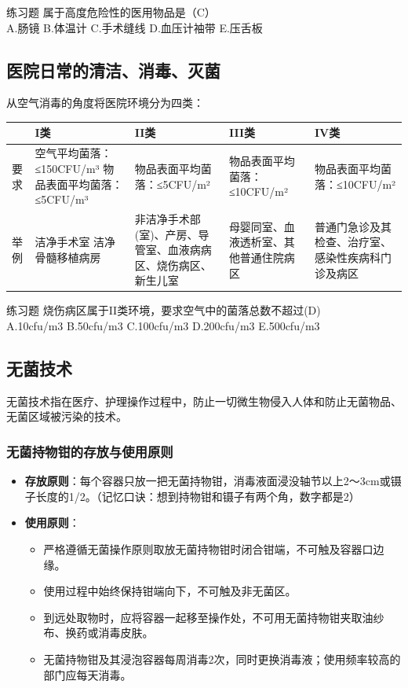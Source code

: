 \documentclass[11pt, a4paper]{ctexart}
\begin{document}
\begin{examplebox}{练习题}
属于高度危险性的医用物品是（C）\\
A.肠镜 \quad B.体温计 \quad C.手术缝线 \quad D.血压计袖带 \quad E.压舌板
\end{examplebox}

\subsection{医院日常的清洁、消毒、灭菌}
从空气消毒的角度将医院环境分为四类：
\begin{table}[htbp]
\centering
\begin{tabular}{|p{2cm}|p{3.5cm}|p{3.5cm}|p{3.5cm}|p{3.5cm}|}
\hline
 & \textbf{I类} & \textbf{II类} & \textbf{III类} & \textbf{IV类} \\
\hline
要求 & 空气平均菌落：≤150CFU/m³ 物品表面平均菌落：≤5CFU/m³ & 物品表面平均菌落：≤5CFU/m² & 物品表面平均菌落：≤10CFU/m² & 物品表面平均菌落：≤10CFU/m² \\
\hline
举例 & 洁净手术室 洁净骨髓移植病房 & 非洁净手术部(室)、产房、导管室、血液病病区、烧伤病区、新生儿室 & 母婴同室、血液透析室、其他普通住院病区 & 普通门急诊及其检查、治疗室、感染性疾病科门诊及病区 \\
\hline
\end{tabular}
\end{table}

\begin{examplebox}{练习题}
烧伤病区属于II类环境，要求空气中的菌落总数不超过(D)\\
A.10cfu/m3 \quad B.50cfu/m3 \quad C.100cfu/m3 \quad D.200cfu/m3 \quad E.500cfu/m3
\end{examplebox}

\subsection{无菌技术}
无菌技术指在医疗、护理操作过程中，防止一切微生物侵入人体和防止无菌物品、无菌区域被污染的技术。

\subsubsection{无菌持物钳的存放与使用原则}
\begin{itemize}
    \item \textbf{存放原则}：每个容器只放一把无菌持物钳，消毒液面浸没轴节以上2～3cm或镊子长度的1/2。（记忆口诀：想到持物钳和镊子有两个角，数字都是2）
    \item \textbf{使用原则}：
    \begin{itemize}
        \item 严格遵循无菌操作原则取放无菌持物钳时闭合钳端，不可触及容器口边缘。
        \item 使用过程中始终保持钳端向下，不可触及非无菌区。
        \item 到远处取物时，应将容器一起移至操作处，不可用无菌持物钳夹取油纱布、换药或消毒皮肤。
        \item 无菌持物钳及其浸泡容器每周消毒2次，同时更换消毒液；使用频率较高的部门应每天消毒。
    \end{itemize}
\end{itemize}
\end{document}
